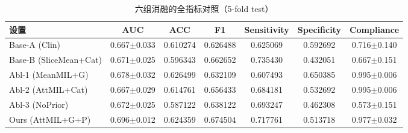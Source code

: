 \begin{table}
\centering
\caption{六组消融的全指标对照（5-fold test）}
\label{tab:ablation_full_metrics}
\small
\begin{tabular}{lcccccc}
\toprule
                                  设置 &             AUC &      ACC &       F1 &  Sensitivity &  Specificity &      Compliance \\
\midrule
                      Base-A (Clin) & 0.667$\pm$0.033 & 0.610274 & 0.626488 &     0.625069 &     0.592692 & 0.716$\pm$0.140 \\
               Base-B (SliceMean+Cat) & 0.671$\pm$0.025 & 0.596343 & 0.662652 &     0.735430 &     0.432051 & 0.667$\pm$0.151 \\
                     Abl-1 (MeanMIL+G) & 0.678$\pm$0.032 & 0.626499 & 0.632109 &     0.607493 &     0.650385 & 0.995$\pm$0.006 \\
                     Abl-2 (AttMIL+Cat) & 0.667$\pm$0.029 & 0.614761 & 0.656433 &     0.684181 &     0.532692 & 0.995$\pm$0.006 \\
                      Abl-3 (NoPrior) & 0.672$\pm$0.025 & 0.587122 & 0.638122 &     0.693247 &     0.462308 & 0.573$\pm$0.151 \\
                        Ours (AttMIL+G+P) & 0.696$\pm$0.012 & 0.624359 & 0.674504 &     0.717761 &     0.513718 & 0.977$\pm$0.032 \\
\bottomrule
\end{tabular}
\end{table}
